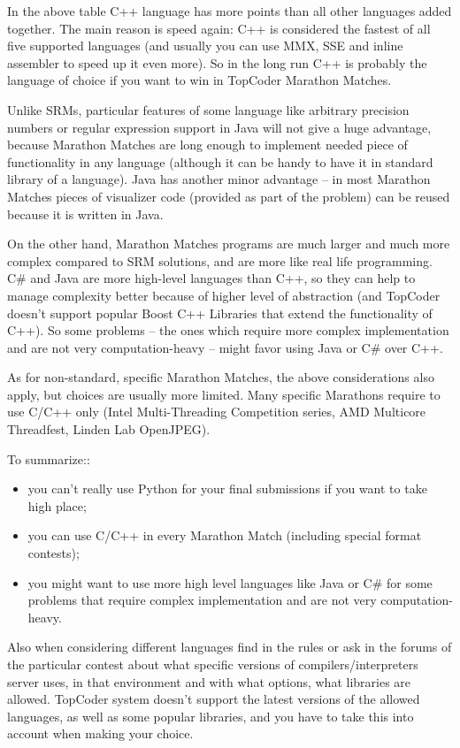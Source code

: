 \documentclass[]{article}
\begin{document}
In the above table C++ language has more points than all other languages
added together. The main reason is speed again: C++ is considered the
fastest of all five supported languages (and usually you can use MMX,
SSE and inline assembler to speed up it even more). So in the long run
C++ is probably the language of choice if you want to win in TopCoder
Marathon Matches.

Unlike SRMs, particular features of some language like arbitrary
precision numbers or regular expression support in Java will not give a
huge advantage, because Marathon Matches are long enough to implement
needed piece of functionality in any language (although it can be handy
to have it in standard library of a language). Java has another minor
advantage -- in most Marathon Matches pieces of visualizer code
(provided as part of the problem) can be reused because it is written in
Java.

On the other hand, Marathon Matches programs are much larger and much
more complex compared to SRM solutions, and are more like real life
programming. C\# and Java are more high-level languages than C++, so
they can help to manage complexity better because of higher level of
abstraction (and TopCoder doesn't support popular Boost C++ Libraries
that extend the functionality of C++). So some problems -- the ones
which require more complex implementation and are not very
computation-heavy -- might favor using Java or C\# over C++.

As for non-standard, specific Marathon Matches, the above considerations
also apply, but choices are usually more limited. Many specific
Marathons require to use C/C++ only (Intel Multi-Threading Competition
series, AMD Multicore Threadfest, Linden Lab OpenJPEG).

To summarize::

\begin{itemize}
\item
  you can't really use Python for your final submissions if you want to
  take high place;
\item
  you can use C/C++ in every Marathon Match (including special format
  contests);
\item
  you might want to use more high level languages like Java or C\# for
  some problems that require complex implementation and are not very
  computation-heavy.
\end{itemize}

Also when considering different languages find in the rules or ask in
the forums of the particular contest about what specific versions of
compilers/interpreters server uses, in that environment and with what
options, what libraries are allowed. TopCoder system doesn't support the
latest versions of the allowed languages, as well as some popular
libraries, and you have to take this into account when making your
choice.
\end{document}
